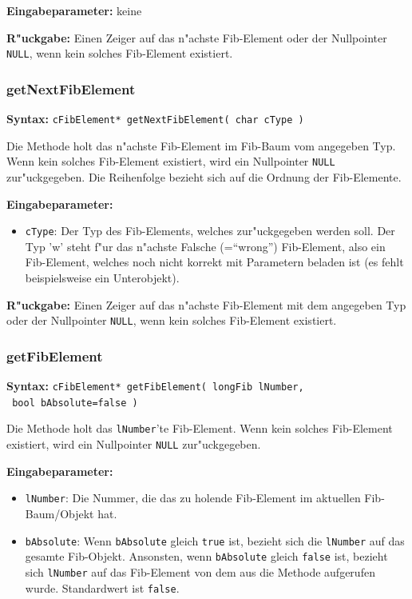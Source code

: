 \bigskip\noindent
\textbf{Eingabeparameter:} keine

\bigskip\noindent
\textbf{R"uckgabe:} Einen Zeiger auf das n"achste Fib-Element oder der Nullpointer \verb|NULL|, wenn kein solches Fib-Element existiert.


\subsubsection{getNextFibElement}

\textbf{Syntax:} \verb|cFibElement* getNextFibElement( char cType )|

\bigskip\noindent
Die Methode holt das n"achste Fib-Element im Fib-Baum vom angegeben Typ. Wenn kein solches Fib-Element existiert, wird ein Nullpointer \verb|NULL| zur"uckgegeben. Die Reihenfolge bezieht sich auf die Ordnung der Fib-Elemente.

\bigskip\noindent
\textbf{Eingabeparameter:}
\begin{itemize}
 \item \verb|cType|: Der Typ des Fib-Elements, welches zur"uckgegeben werden soll. Der Typ 'w' steht f"ur das n"achste Falsche (=``wrong'') Fib-Element, also ein Fib-Element, welches noch nicht korrekt mit Parametern beladen ist (es fehlt beispielsweise ein Unterobjekt).
\end{itemize}

\bigskip\noindent
\textbf{R"uckgabe:} Einen Zeiger auf das n"achste Fib-Element mit dem angegeben Typ oder der Nullpointer \verb|NULL|, wenn kein solches Fib-Element existiert.


\subsubsection{getFibElement}

\textbf{Syntax:} \verb|cFibElement* getFibElement( longFib lNumber,| \\\verb| bool bAbsolute=false )|

\bigskip\noindent
Die Methode holt das \verb|lNumber|'te Fib-Element. Wenn kein solches Fib-Element existiert, wird ein Nullpointer \verb|NULL| zur"uckgegeben.

\bigskip\noindent
\textbf{Eingabeparameter:}
\begin{itemize}
 \item \verb|lNumber|: Die Nummer, die das zu holende Fib-Element im aktuellen Fib-Baum/Objekt hat.
 \item \verb|bAbsolute|: Wenn \verb|bAbsolute| gleich \verb|true| ist, bezieht sich die \verb|lNumber| auf das gesamte Fib-Objekt. Ansonsten, wenn \verb|bAbsolute| gleich \verb|false| ist, bezieht sich \verb|lNumber| auf das Fib-Element von dem aus die Methode aufgerufen wurde. Standardwert ist \verb|false|.
\end{itemize}

